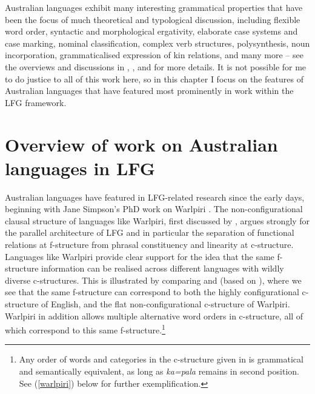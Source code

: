 \documentclass[output=paper,hidelinks]{langscibook}
\begin{document}
\begin{sloppypar}
Australian languages exhibit many interesting grammatical properties that have been the focus of much theoretical and typological discussion, including flexible word order, syntactic and morphological ergativity, elaborate case systems and case marking, nominal classification, complex verb structures, polysynthesis, noun incorporation, grammaticalised expression of kin relations, and many more -- see the overviews and discussions in \citet{Dixon2002}, \citet{KochNord14}, and \citet{BowernOzlges} for more details. It is not possible for me to do justice to all of this work here, so in this chapter I focus on the features of Australian languages that have featured most prominently in work within the LFG framework.
\end{sloppypar}

\section{Overview of work on Australian languages in LFG}
\label{sec:overview}
Australian languages have featured in LFG-related research since the early days, beginning with Jane Simpson's PhD work on Warlpiri \citep{Simpson1983}. The non-configurational clausal structure of languages like Warlpiri, first discussed by \citet{Hale81,Hale82,Hale83}, argues strongly for the parallel architecture of LFG and in particular the separation of functional relations at f-structure from phrasal constituency and linearity at c-structure. Languages like Warlpiri provide clear support for the idea that the same f-structure information can be realised across different languages with wildly diverse c-structures. This is illustrated by comparing  and  (based on \citealt[3--4]{BresnanEtAl2016}), where we see that the same f-structure can correspond to both the highly configurational c-structure of English, and the flat non-configurational c-structure of Warlpiri. Warlpiri in addition allows multiple alternative word orders in c-structure, all of which correspond to this same f-structure.\footnote{Any order of words and categories in the c-structure given in  is grammatical and semantically equivalent, as long as {\it ka=pala} remains in second position. See (\ref{warlpiri}) below for further exemplification.}  
\end{document}
